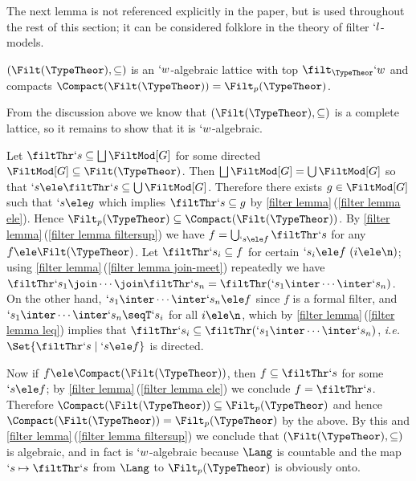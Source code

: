\documentclass{lmcs}
\def\ie{\emph{i.e.}}
\def\Steffen#1{}\def\Ugo#1{}\def\Franco#1{}
\begin{document}
 \Steffen{The next lemma is not referenced in the paper.
Moreover, it seems that you are using some knowledge here that is unspecified.
For example, it seems you show that $\Compact(\Filt(\TypeTheor)) = \Filt_p(\TypeTheor)$; we have defined $\Filt_p(\TypeTheor)$, but not $\Compact(\Filt(\TypeTheor))$.
So how can this proof check the equality?.}

The next lemma is not referenced explicitly in the paper, but is used throughout the rest of this section; it can be considered folklore in the theory of filter $`l$-models.

 \begin{lem} \label{prop:formal-filt}
$(\Filt(\TypeTheor),\subseteq)$ is an $`w $-algebraic lattice with top $\filt_{\TypeTheor} `w$ and compacts $\Compact(\Filt(\TypeTheor)) = \Filt_p(\TypeTheor)$.
 \end{lem}

 \begin{Proof}
From the discussion above we know that $(\Filt(\TypeTheor),\subseteq)$ is a complete lattice, so it remains to show that it is $`w$-algebraic.

Let $\filtThr `s \subseteq \bigsqcup{\FiltMod[G]}$ for some directed ${\FiltMod[G]} \subseteq \Filt(\TypeTheor)$. 
Then $\bigsqcup{\FiltMod[G]} = \bigcup{\FiltMod[G]}$ so that $`s\ele \filtThr `s \subseteq \bigcup{\FiltMod[G]}$. Therefore there exists $g\in{\FiltMod[G]}$ such that $`s\ele g$ which implies $\filtThr `s \subseteq g$ by \ref{filter lemma}\,(\ref{filter lemma ele}). 
Hence $\Filt_p(\TypeTheor) \subseteq \Compact(\Filt(\TypeTheor))$.
%
By \ref{filter lemma}\,(\ref{filter lemma filtersup}) we have $f = \bigcup_{`s \ele f} \filtThr `s $ for any $f \ele \Filt(\TypeTheor)$. 
Let $\filtThr `s_i \subseteq f$ for certain $`s_i \ele f ~ (i \ele \n)$; using \ref{filter lemma}\,(\ref{filter lemma join-meet}) repeatedly we have $\filtThr `s_1 \join\cdots\join \filtThr`s_n = \filtThr(`s_1\inter\cdots\inter `s_n)$. 
On the other hand, $`s_1\inter\cdots\inter `s_n \ele f$ since $f$ is a formal filter, and $`s_1\inter\cdots\inter `s_n \seqT `s_i$ for all $i \ele \n$, which by \ref{filter lemma}\,(\ref{filter lemma leq}) implies that $ \filtThr `s_i \subseteq \filtThr(`s_1\inter\cdots\inter `s_n)$, \ie~$\Set{\filtThr `s \mid `s\ele f}$ is directed. 

Now if $f\ele \Compact(\Filt(\TypeTheor))$, then $f\subseteq \filtThr `s$ for some $`s \ele f$; by \ref{filter lemma}\,(\ref{filter lemma ele}) we conclude $f = \filtThr `s$. 
Therefore $\Compact(\Filt(\TypeTheor))\subseteq \Filt_p(\TypeTheor)$ and hence $\Compact(\Filt(\TypeTheor)) = \Filt_p(\TypeTheor)$ by the above. 
By this and \ref{filter lemma}\,(\ref{filter lemma filtersup}) we conclude that $(\Filt(\TypeTheor),\subseteq)$ is algebraic, and in fact is $`w$-algebraic because $\Lang$ is countable and the map $`s \mapsto \filtThr `s$ from $\Lang$ to $ \Filt_p(\TypeTheor)$ is obviously onto.
 \end{Proof}
\end{document}
